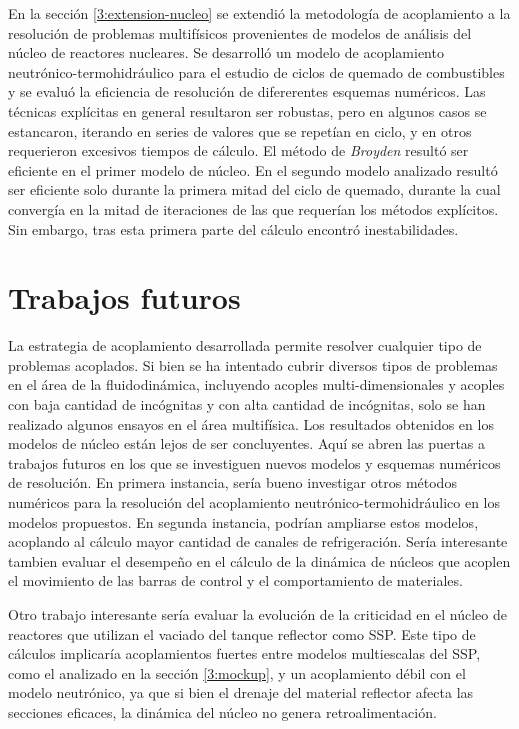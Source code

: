 En la sección \ref{3:extension-nucleo} se extendió la metodología de acoplamiento a la resolución de problemas multifísicos provenientes de modelos de análisis del núcleo de reactores nucleares.
Se desarrolló un modelo de acoplamiento neutrónico-termohidráulico para el estudio de ciclos de quemado de combustibles y se evaluó la eficiencia de resolución de difererentes esquemas numéricos.
Las técnicas explícitas en general resultaron ser robustas, pero en algunos casos se estancaron, iterando en series de valores que se repetían en ciclo,
y en otros requerieron excesivos tiempos de cálculo.
El método de \textit{Broyden} resultó ser eficiente en el primer modelo de núcleo.
En el segundo modelo analizado resultó ser eficiente solo durante la primera mitad del ciclo de quemado,
durante la cual convergía en la mitad de iteraciones de las que requerían los métodos explícitos.
Sin embargo, tras esta primera parte del cálculo encontró inestabilidades.


\section{Trabajos futuros}
\label{trabajos-futuros}

La estrategia de acoplamiento desarrollada permite resolver cualquier tipo de problemas acoplados.
Si bien se ha intentado cubrir diversos tipos de problemas en el área de la fluidodinámica,
incluyendo acoples multi-dimensionales y acoples con baja cantidad de incógnitas y con alta cantidad de incógnitas,
solo se han realizado algunos ensayos en el área multifísica.
Los resultados obtenidos en los modelos de núcleo están lejos de ser concluyentes.
Aquí se abren las puertas a trabajos futuros en los que se investiguen nuevos modelos y esquemas numéricos de resolución.
En primera instancia, sería bueno investigar otros métodos numéricos para la resolución del acoplamiento neutrónico-termohidráulico en los modelos propuestos.
En segunda instancia, podrían ampliarse estos modelos, acoplando al cálculo mayor cantidad de canales de refrigeración.
Sería interesante tambien evaluar el desempeño en el cálculo de la dinámica de núcleos que acoplen el movimiento de las barras de control y el comportamiento de materiales.

Otro trabajo interesante sería evaluar la evolución de la criticidad en el núcleo de reactores que utilizan el vaciado del tanque reflector como SSP.
Este tipo de cálculos implicaría acoplamientos fuertes entre modelos multiescalas del SSP, como el analizado en la sección \ref{3:mockup},
y un acoplamiento débil con el modelo neutrónico, ya que si bien el drenaje del material reflector afecta las secciones eficaces,
la dinámica del núcleo no genera retroalimentación.

